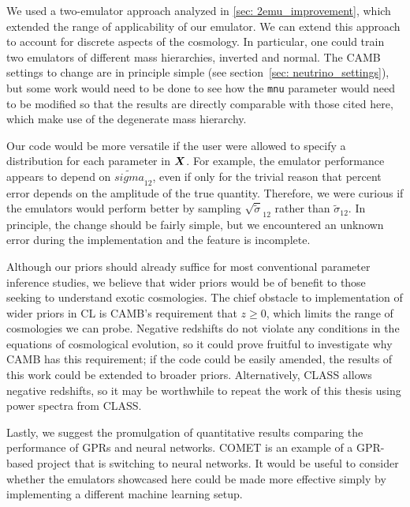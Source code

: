 We used a two-emulator approach analyzed in \ref{sec: 2emu_improvement},
which extended the range of applicability of our emulator. We can extend this
approach to account for discrete aspects of the cosmology. In particular, 
one could train two emulators of different mass hierarchies, inverted and
normal. The CAMB settings to change are in principle simple (see
section~\ref{sec: neutrino_settings}), but some work would need to be done to
see how the \texttt{mnu} parameter would need to be modified so that the
results are directly comparable with those cited here, which make use of the
degenerate mass hierarchy.

Our code would be more versatile if the user were allowed to specify a
distribution for each parameter in $\bm{X}$. For example, the emulator
performance appears to depend on $\tilde{sigma}_{12}$,
even if only for the trivial
reason that percent error depends on the amplitude of the true quantity.
Therefore, we were curious if the emulators would perform better by
sampling $\sqrt{\tilde{\sigma}}_{12}$ rather than $\tilde{\sigma}_{12}$.
In principle, the change should be fairly simple, but we encountered an
unknown error during the implementation and the feature is incomplete.




Although our priors should already suffice for most conventional parameter
inference studies, we believe that wider priors would be of benefit to those
seeking to understand exotic cosmologies. The chief obstacle to 
implementation of wider priors in CL is CAMB's requirement that $z \geq 0$,
which limits the range of cosmologies we can probe. 
Negative redshifts do not violate any conditions in the equations of
cosmological evolution, so it could prove fruitful to investigate why CAMB 
has this requirement; if the code could be easily amended, the results of
this work could be extended to broader priors. Alternatively,
CLASS allows negative redshifts, so it may be worthwhile 
to repeat the work of this thesis using power spectra from CLASS.


Lastly, we suggest the promulgation of quantitative results comparing the
performance of GPRs and neural networks. COMET is an example of a GPR-based
project that is switching to neural networks. It would be useful to consider
whether the emulators showcased here could be made more effective simply by
implementing a different machine learning setup. 

